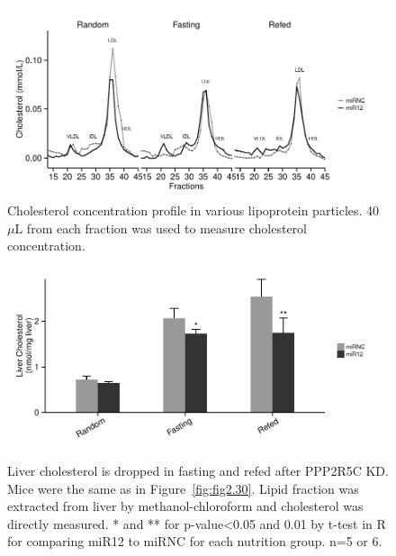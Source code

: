 \begin{figure}[htbp]
\centering
\includegraphics[width=1\textwidth]{figs/fig2-41 fplc_chol.pdf}
\caption[Cholesterol concentration in lipoprotein particles]{\footnotesize Cholesterol concentration profile in various lipoprotein particles. 40 $\mu$L from each fraction was used to measure cholesterol concentration.}
\label{fig:fig2.41}
\end{figure}


\begin{figure}[htbp]
\centering
\includegraphics[width=1\textwidth]{figs/fig2-35 liver chol.pdf}
\caption[Liver cholesterol drops upon PPP2R5C KD]{\footnotesize Liver cholesterol is dropped in fasting and refed after PPP2R5C KD. Mice were the same as in Figure~\ref{fig:fig2.30}. Lipid fraction was extracted from liver by methanol-chloroform and cholesterol was directly measured. * and ** for p-value<0.05 and 0.01 by t-test in R for comparing miR12 to miRNC for each nutrition group. n=5 or 6.}
\label{fig:fig2.35}
\end{figure}

